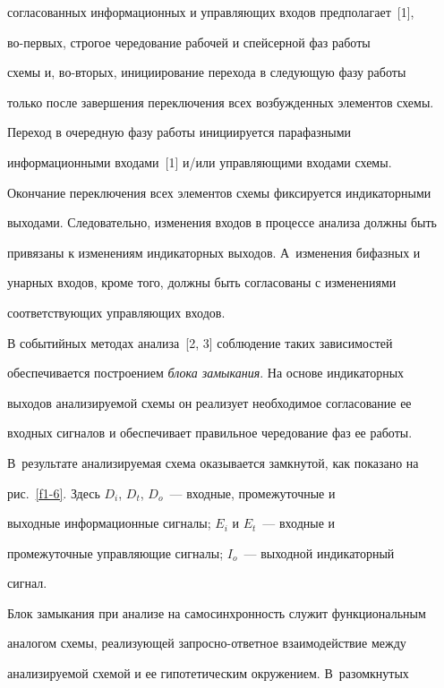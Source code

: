 согласованных информационных и управляющих входов предполагает~[1], 


      во-пер\-вых, строгое чередование рабочей и спейсерной фаз работы 


схемы и, во-вто\-рых, инициирование перехода в следующую фазу работы 


только после завершения переключения всех возбужденных элементов схемы. 


Переход в очередную фазу работы инициируется парафазными 


информационными входами~[1] и/или управ\-ля\-ющи\-ми входами схемы. 


Окончание переключения всех элементов схемы фиксируется индикаторными 


выходами. Следовательно, изменения входов в процессе анализа должны быть 


привязаны к изменениям индикаторных выходов. А~изменения бифазных и 


унарных входов, кроме того, должны быть согласованы с изменениями 


соответствующих управляющих входов.


      


      В событийных методах анализа~[2, 3] соблюдение таких зависимостей 


обеспечивается построением \textit{блока замыкания}. На основе индикаторных 


выходов анализируемой схемы он реализует необходимое согласование ее 


входных сигналов и обеспечивает правильное чередование фаз ее работы. 


В~результате анализируемая схема оказывается замкнутой, как показано на 


рис.~\ref{f1-6}. Здесь $D_i$, $D_t$, $D_o$~---  входные, промежуточные и 


выходные информационные сигналы; $E_i$ и $E_t$~--- входные и 


промежуточные управляющие сигналы; $I_o$~--- выходной индикаторный 


сигнал. 


      


      Блок замыкания при анализе на самосинхронность служит функциональным 


аналогом схемы, реализующей за\-прос\-но-от\-вет\-ное взаимодействие между 


анализируемой схемой и ее гипотетическим окружением. В~разомкнутых 


